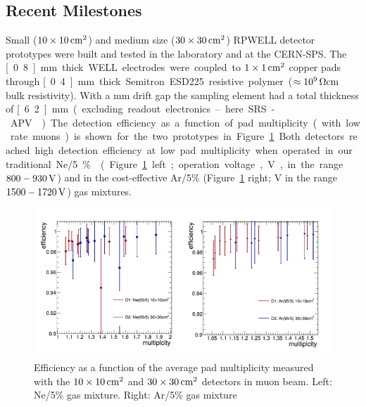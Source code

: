 \subsection{Recent Milestones}
Small ($\unit[10\times 10]{cm^2}$) and medium size ($\unit[30\times 30]{cm^2}$) RPWELL detector prototypes were built and tested in the laboratory and at the CERN-SPS. The \unit[0.8]{mm} thick WELL electrodes were coupled to $\unit[1\times 1]{cm^2}$ copper pads through \unit[0.4]{mm} thick Semitron ESD225 resistive polymer ($\approx \unit[10^9]{\Omega cm}$ bulk resistivity). With a \unit[5]{mm} drift gap the sampling element had a total thickness of \unit[6.2]{mm} (excluding readout electronics – here SRS-APV~\cite{1748-0221-8-03-C03015,French2001359}).
The detection efficiency as a function of pad multiplicity (with low rate muons) is shown for the two prototypes in Figure~\ref{fig:Calorimeter:THGEM:efficiencyVSMultiplicity}. Both detectors reached high detection efficiency at low pad multiplicity when operated in our traditional Ne/5\% (Figure~\ref{fig:Calorimeter:THGEM:efficiencyVSMultiplicity} left; operation voltage, V, in the range $800-\unit[930]{V}$) and in the cost-effective Ar/5\% (Figure~\ref{fig:Calorimeter:THGEM:efficiencyVSMultiplicity} right; V in the range $1500-\unit[1720]{V}$) gas mixtures.
\begin{figure}
	\includegraphics[width=.9\textwidth]{Calorimeter/THGEM/efficiencyVSMultiplicity.png}
	\caption{Efficiency as a function of the average pad multiplicity measured with the $\unit[10\times 10]{cm^2}$ and $\unit[30\times 30]{cm^2}$ detectors in muon beam. Left: Ne/5\% gas mixture. Right: Ar/5\% gas mixture}
	\label{fig:Calorimeter:THGEM:efficiencyVSMultiplicity}
\end{figure}
